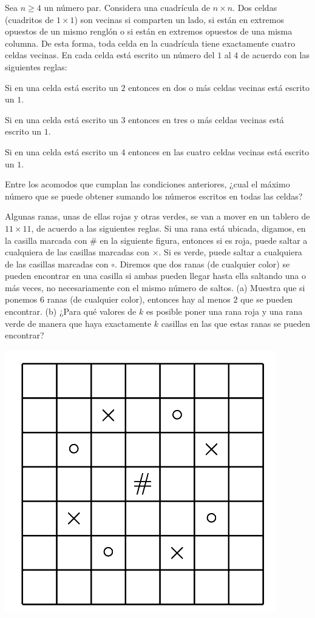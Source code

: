 \documentclass[11pt]{scrartcl}
\begin{document}
\begin{problem}
    [2012/2]
    Sea $n \geq 4$ un número par. Considera una cuadrícula de $n \times n$. Dos celdas (cuadritos
de $1 \times 1$) son vecinas si comparten un lado, si están en extremos opuestos de un mismo
renglón o si están en extremos opuestos de una misma columna. De esta forma, toda celda
en la cuadrícula tiene exactamente cuatro celdas vecinas.
En cada celda está escrito un número del $1$ al $4$ de acuerdo con las siguientes reglas:

Si en una celda está escrito un $2$ entonces en dos o más celdas vecinas está escrito
un $1$.

Si en una celda está escrito un $3$ entonces en tres o más celdas vecinas está escrito
un $1$.

Si en una celda está escrito un $4$ entonces en las cuatro celdas vecinas está escrito
un $1$.

Entre los acomodos que cumplan las condiciones anteriores, ¿cual el máximo número que
se puede obtener sumando los números escritos en todas las celdas?
\end{problem}
\begin{problem}
    [2012/5]
    Algunas ranas, unas de ellas rojas y otras verdes, se van a mover en un tablero de $11 \times 11$,
de acuerdo a las siguientes reglas. Si una rana está ubicada, digamos, en la casilla marcada
con $\#$ en la siguiente figura, entonces si es roja, puede saltar a cualquiera de las casillas marcadas con $\times$. Si es verde, puede saltar a cualquiera de las casillas marcadas con $\circ$.
Diremos que dos ranas (de cualquier color) se pueden encontrar en una casilla si ambas
pueden llegar hasta ella saltando una o más veces, no necesariamente con el mismo número
de saltos.
(a) Muestra que si ponemos $6$ ranas (de cualquier color), entonces hay al menos $2$ que se
pueden encontrar.
(b) ¿Para qué valores de $k$ es posible poner una rana roja y una rana verde de manera
que haya exactamente $k$ casillas en las que estas ranas se pueden encontrar?
    \begin{center}
        \includegraphics[scale=0.3]{12OMM5.png}
    \end{center}
\end{problem}
\end{document}
